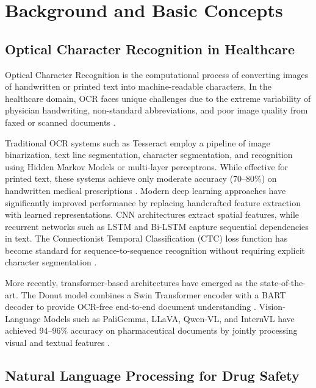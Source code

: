 \documentclass[conference]{IEEEtran}
\begin{document}
\section{Background and Basic Concepts}
\label{sec:background}

\subsection{Optical Character Recognition in Healthcare}

Optical Character Recognition is the computational process of converting images of handwritten or printed text into machine-readable characters. In the healthcare domain, OCR faces unique challenges due to the extreme variability of physician handwriting, non-standard abbreviations, and poor image quality from faxed or scanned documents \cite{mankash2024mirage,intuitionlabs2026pharma,babu2024aidriven}.

Traditional OCR systems such as Tesseract employ a pipeline of image binarization, text line segmentation, character segmentation, and recognition using Hidden Markov Models or multi-layer perceptrons. While effective for printed text, these systems achieve only moderate accuracy (70--80\%) on handwritten medical prescriptions \cite{talekar2025interpreting}. Modern deep learning approaches have significantly improved performance by replacing handcrafted feature extraction with learned representations. CNN architectures extract spatial features, while recurrent networks such as LSTM and Bi-LSTM capture sequential dependencies in text. The Connectionist Temporal Classification (CTC) loss function has become standard for sequence-to-sequence recognition without requiring explicit character segmentation \cite{mankash2024mirage,intuitionlabs2026pharma}.

More recently, transformer-based architectures have emerged as the state-of-the-art. The Donut model combines a Swin Transformer encoder with a BART decoder to provide OCR-free end-to-end document understanding \cite{mankash2024mirage}. Vision-Language Models such as PaliGemma, LLaVA, Qwen-VL, and InternVL have achieved 94--96\% accuracy on pharmaceutical documents by jointly processing visual and textual features \cite{sharjeel2025ai}.

\subsection{Natural Language Processing for Drug Safety}
\end{document}

